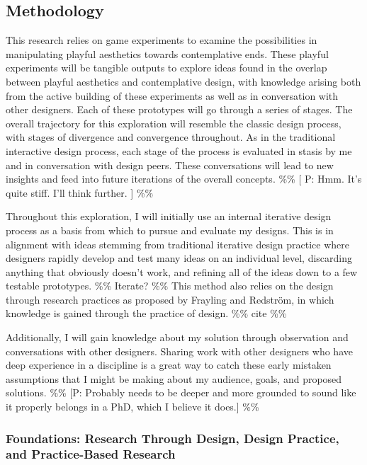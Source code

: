 \documentclass[
]{article}
\begin{document}
\subsection{Methodology}\label{methodology}

This research relies on game experiments to examine the possibilities in
manipulating playful aesthetics towards contemplative ends. These
playful experiments will be tangible outputs to explore ideas found in
the overlap between playful aesthetics and contemplative design, with
knowledge arising both from the active building of these experiments as
well as in conversation with other designers. Each of these prototypes
will go through a series of stages. The overall trajectory for this
exploration will resemble the classic design process, with stages of
divergence and convergence throughout. As in the traditional interactive
design process, each stage of the process is evaluated in stasis by me
and in conversation with design peers. These conversations will lead to
new insights and feed into future iterations of the overall concepts.
\%\% {[} P: Hmm. It's quite stiff. I'll think further. {]} \%\%

Throughout this exploration, I will initially use an internal iterative
design process as a basis from which to pursue and evaluate my designs.
This is in alignment with ideas stemming from traditional iterative
design practice where designers rapidly develop and test many ideas on
an individual level, discarding anything that obviously doesn't work,
and refining all of the ideas down to a few testable prototypes. \%\%
Iterate? \%\% This method also relies on the design through research
practices as proposed by Frayling and Redström, in which knowledge is
gained through the practice of design. \%\% cite \%\%

Additionally, I will gain knowledge about my solution through
observation and conversations with other designers. Sharing work with
other designers who have deep experience in a discipline is a great way
to catch these early mistaken assumptions that I might be making about
my audience, goals, and proposed solutions. \%\% {[}P: Probably needs to
be deeper and more grounded to sound like it properly belongs in a PhD,
which I believe it does.{]} \%\%

\subsubsection{Foundations: Research Through Design, Design Practice,
and Practice-Based
Research}\label{foundations-research-through-design-design-practice-and-practice-based-research}
\end{document}
